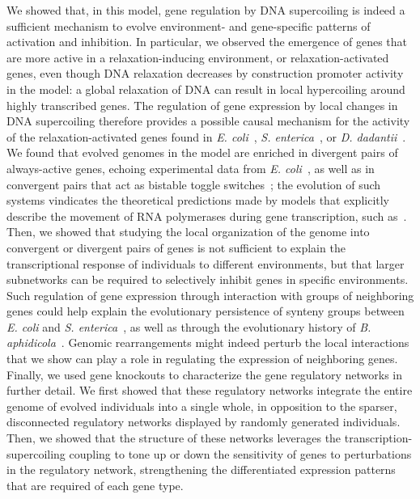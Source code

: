 We showed that, in this model, gene regulation by DNA supercoiling is indeed a sufficient mechanism to evolve environment- and gene-specific patterns of activation and inhibition.
In particular, we observed the emergence of genes that are more active in a relaxation-inducing environment, or relaxation-activated genes, even though DNA relaxation decreases by construction promoter activity in the model: a global relaxation of DNA can result in local hypercoiling around highly transcribed genes.
The regulation of gene expression by local changes in DNA supercoiling therefore provides a possible causal mechanism for the activity of the relaxation-activated genes found in \emph{E. coli}~\citep{peter2004}, \emph{S. enterica}~\citep{webber2013}, or \emph{D. dadantii}~\citep{pineau2022}.
We found that evolved genomes in the model are enriched in divergent pairs of always-active genes, echoing experimental data from \emph{E. coli}~\citep{sobetzko2016}, as well as in convergent pairs that act as bistable toggle switches~\citep{gardner2000}; the evolution of such systems vindicates the theoretical predictions made by models that explicitly describe the movement of RNA polymerases during gene transcription, such as~\cite{sevier2021}.
Then, we showed that studying the local organization of the genome into convergent or divergent pairs of genes is not sufficient to explain the transcriptional response of individuals to different environments, but that larger subnetworks can be required to selectively inhibit genes in specific environments.
Such regulation of gene expression through interaction with groups of neighboring genes could help explain the evolutionary persistence of synteny groups between \emph{E. coli} and \emph{S. enterica}~\citep{junier2016}, as well as through the evolutionary history of \emph{B. aphidicola}~\citep{brinza2013}.
Genomic rearrangements might indeed perturb the local interactions that we show can play a role in regulating the expression of neighboring genes.
Finally, we used gene knockouts to characterize the gene regulatory networks in further detail.
We first showed that these regulatory networks integrate the entire genome of evolved individuals into a single whole, in opposition to the sparser, disconnected regulatory networks displayed by randomly generated individuals.
Then, we showed that the structure of these networks leverages the transcription-supercoiling coupling to tone up or down the sensitivity of genes to perturbations in the regulatory network, strengthening the differentiated expression patterns that are required of each gene type.

